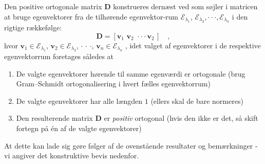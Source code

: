 \begin{theorem}
Den positive ortogonale matrix $\mathbf{D}$ konstrueres dernæst ved som søjler i matricen at bruge egenvektorer fra de tilhørende egenvektor-rum $\mathcal{E}_{\lambda_{1}}$, $\mathcal{E}_{\lambda_{2}}, \cdot \cdot \cdot , \mathcal{E}_{\lambda_{n}}$ i den rigtige rækkefølge:
\begin{equation}
\mathbf{D} = \left[\mathbf{v}_{1}\,\, \mathbf{v}_{2} \, \, \cdot \cdot \cdot  \mathbf{v}_{2}\, \right] \quad ,
\end{equation}
hvor $\mathbf{v}_{1} \in \mathcal{E}_{\lambda_{1}}$, $\mathbf{v}_{2} \in \mathcal{E}_{\lambda_{2}}$, $\cdot$ $\cdot$ $\cdot$, $\mathbf{v}_{n} \in \mathcal{E}_{\lambda_{n}}\,\,$, idet valget af egenvektorer i de respektive egenvektorrum foretages således at
\begin{enumerate}
\item De valgte egenvektorer hørende til samme egenværdi er ortogonale  (brug Gram--Schmidt ortogonalisering i hvert fælles egenvektorrum)
\item De valgte egenvektorer har alle længden $1$ (ellers skal de bare normeres)
\item Den resulterende matrix $\mathbf{D}$ er {\em{positiv}} ortogonal (hvis den ikke er det, så skift fortegn på \'{e}n af de valgte egenvektorer)
\end{enumerate}
At dette kan lade sig gøre følger af de ovenstående resultater og bemærkninger - vi angiver det konstruktive bevis nedenfor.
\end{theorem}
